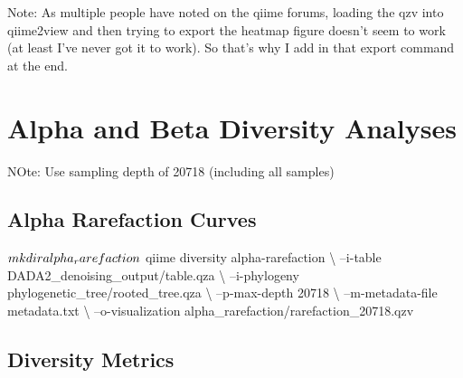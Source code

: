 \documentclass[
]{book}
\newenvironment{Shaded}{\begin{snugshade}}{\end{snugshade}}
\newcommand{\ExtensionTok}[1]{#1}
\newcommand{\FunctionTok}[1]{\textcolor[rgb]{0.00,0.00,0.00}{#1}}
\newcommand{\NormalTok}[1]{#1}
\begin{document}
Note: As multiple people have noted on the qiime forums, loading the qzv into qiime2view and then trying to export the heatmap figure doesn't seem to work (at least I've never got it to work). So that's why I add in that export command at the end.

\hypertarget{alpha-and-beta-diversity-analyses}{%
\chapter{Alpha and Beta Diversity Analyses}\label{alpha-and-beta-diversity-analyses}}

NOte: Use sampling depth of 20718 (including all samples)

\hypertarget{alpha-rarefaction-curves}{%
\section{Alpha Rarefaction Curves}\label{alpha-rarefaction-curves}}

\begin{Shaded}
\begin{Highlighting}[]
\NormalTok{$ }\FunctionTok{mkdir}\NormalTok{ alpha_rarefaction}

\NormalTok{$ }\ExtensionTok{qiime}\NormalTok{ diversity alpha-rarefaction \textbackslash{}}
\NormalTok{--i-table DADA2_denoising_output/table.qza \textbackslash{}}
\NormalTok{--i-phylogeny phylogenetic_tree/rooted_tree.qza \textbackslash{}}
\NormalTok{--p-max-depth 20718 \textbackslash{}}
\NormalTok{--m-metadata-file metadata.txt \textbackslash{}}
\NormalTok{--o-visualization alpha_rarefaction/rarefaction_20718.qzv}
\end{Highlighting}
\end{Shaded}

\hypertarget{diversity-metrics}{%
\section{Diversity Metrics}\label{diversity-metrics}}

\begin{Shaded}
\end{Shaded}
\end{document}
